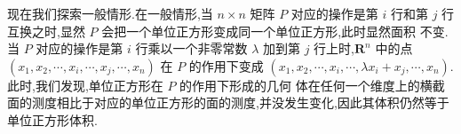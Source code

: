 \documentclass[a4paper, 12pt]{article} %
\begin{document}
现在我们探索一般情形.在一般情形,当 $n\times n$ 矩阵 $P$ 对应的操作是第
$i$ 行和第 $j$ 行互换之时,显然 $P$ 会把一个单位正方形变成同一个单位正方形,此时显然面积
不变.当 $P$ 对应的操作是第 $i$ 行乘以一个非零常数 $\lambda$ 加到第 $j$
行上时,$\mathbf{R}^n$ 中的点 $(x_1,x_2,\cdots,x_i,\cdots,x_j,\cdots,x_n)$
在 $P$ 的作用下变成 $(x_1,x_2,\cdots,x_i,\cdots,\lambda
x_i+x_j,\cdots,x_n)$.此时,我们发现,单位正方形在 $P$ 的作用下形成的几何
体在任何一个维度上的横截面的测度相比于对应的单位正方形的面的测度,并没发生变化,因此其体积仍然等于单位正方形体积.
  

  

  
\end{document}
